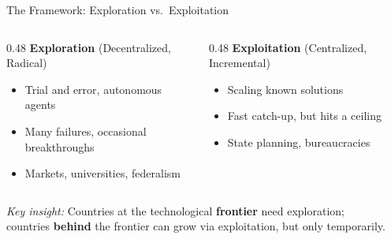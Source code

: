 \documentclass[aspectratio=169, 11pt]{beamer}
\begin{document}
\begin{frame}{The Framework: Exploration vs.\ Exploitation}
    \begin{columns}[T]
        \begin{column}{0.48\textwidth}
            \textbf{Exploration} (Decentralized, Radical)
            \begin{itemize}
                \item Trial and error, autonomous agents
                \item Many failures, occasional breakthroughs
                \item Markets, universities, federalism
            \end{itemize}
        \end{column}
        \begin{column}{0.48\textwidth}
            \textbf{Exploitation} (Centralized, Incremental)
            \begin{itemize}
                \item Scaling known solutions
                \item Fast catch-up, but hits a ceiling
                \item State planning, bureaucracies
            \end{itemize}
        \end{column}
    \end{columns}

    \vspace{1em}
    \pause

    \begin{center}
        \textit{Key insight:} Countries at the technological \textbf{frontier} need exploration; \\
        countries \textbf{behind} the frontier can grow via exploitation, but only temporarily.
    \end{center}


\end{frame}
\end{document}

